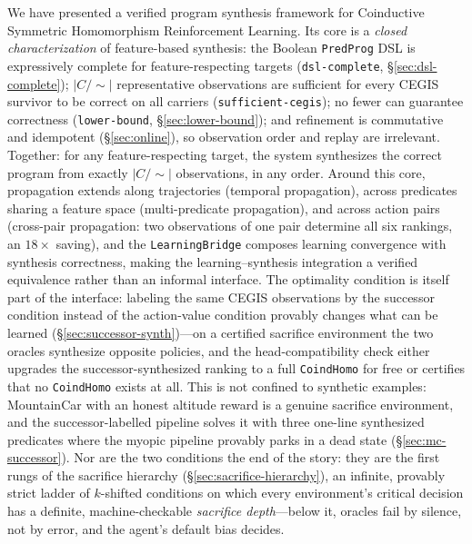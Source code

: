 \documentclass[9pt,a4paper]{article}
\theoremstyle{plain}
\theoremstyle{definition}
\theoremstyle{remark}
\begin{document}
We have presented a verified program synthesis framework for Coinductive Symmetric Homomorphism Reinforcement Learning.  Its core is a \emph{closed characterization} of feature-based synthesis: the Boolean \texttt{PredProg} DSL is expressively complete for feature-respecting targets (\texttt{dsl-complete}, \S\ref{sec:dsl-complete}); $|C/{\sim}|$ representative observations are sufficient for every CEGIS survivor to be correct on all carriers (\texttt{sufficient-cegis}); no fewer can guarantee correctness (\texttt{lower-bound}, \S\ref{sec:lower-bound}); and refinement is commutative and idempotent (\S\ref{sec:online}), so observation order and replay are irrelevant.  Together: for any feature-respecting target, the system synthesizes the correct program from exactly $|C/{\sim}|$ observations, in any order.  Around this core, propagation extends along trajectories (temporal propagation), across predicates sharing a feature space (multi-predicate propagation), and across action pairs (cross-pair propagation: two observations of one pair determine all six rankings, an $18\times$ saving), and the \texttt{LearningBridge} composes learning convergence with synthesis correctness, making the learning--synthesis integration a verified equivalence rather than an informal interface.  The optimality condition is itself part of the interface: labeling the same CEGIS observations by the successor condition instead of the action-value condition provably changes what can be learned (\S\ref{sec:successor-synth})---on a certified sacrifice environment the two oracles synthesize opposite policies, and the head-compatibility check either upgrades the successor-synthesized ranking to a full \texttt{CoindHomo} for free or certifies that no \texttt{CoindHomo} exists at all.  This is not confined to synthetic examples: MountainCar with an honest altitude reward is a genuine sacrifice environment, and the successor-labelled pipeline solves it with three one-line synthesized predicates where the myopic pipeline provably parks in a dead state (\S\ref{sec:mc-successor}).  Nor are the two conditions the end of the story: they are the first rungs of the sacrifice hierarchy (\S\ref{sec:sacrifice-hierarchy}), an infinite, provably strict ladder of $k$-shifted conditions on which every environment's critical decision has a definite, machine-checkable \emph{sacrifice depth}---below it, oracles fail by silence, not by error, and the agent's default bias decides.
\end{document}
